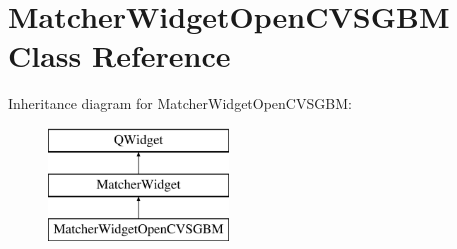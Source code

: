 \hypertarget{class_matcher_widget_open_c_v_s_g_b_m}{}\section{Matcher\+Widget\+Open\+C\+V\+S\+G\+B\+M Class Reference}
\label{class_matcher_widget_open_c_v_s_g_b_m}
Inheritance diagram for Matcher\+Widget\+Open\+C\+V\+S\+G\+B\+M\+:\begin{figure}[H]
\begin{center}
\leavevmode
\includegraphics[height=3.000000cm]{class_matcher_widget_open_c_v_s_g_b_m}
\end{center}
\end{figure}
